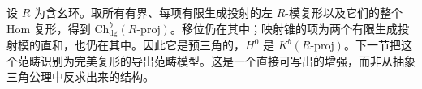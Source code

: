 \begin{example}\label{b4:exm:bounded-projective-enhancement}
	设 \(R\) 为含幺环。取所有有界、每项有限生成投射的左 \(R\)-模复形以及它们的整个 Hom 复形，得到 \(\mathrm{Ch}^b_{\mathrm{dg}}(R\text{-}\mathrm{proj})\)。移位仍在其中；映射锥的项为两个有限生成投射模的直和，也仍在其中。因此它是预三角的，\(H^0\) 是 \(K^b(R\text{-}\mathrm{proj})\)。下一节把这个范畴识别为完美复形的导出范畴模型。这是一个直接可写出的增强，而非从抽象三角公理中反求出来的结构。
\end{example}
